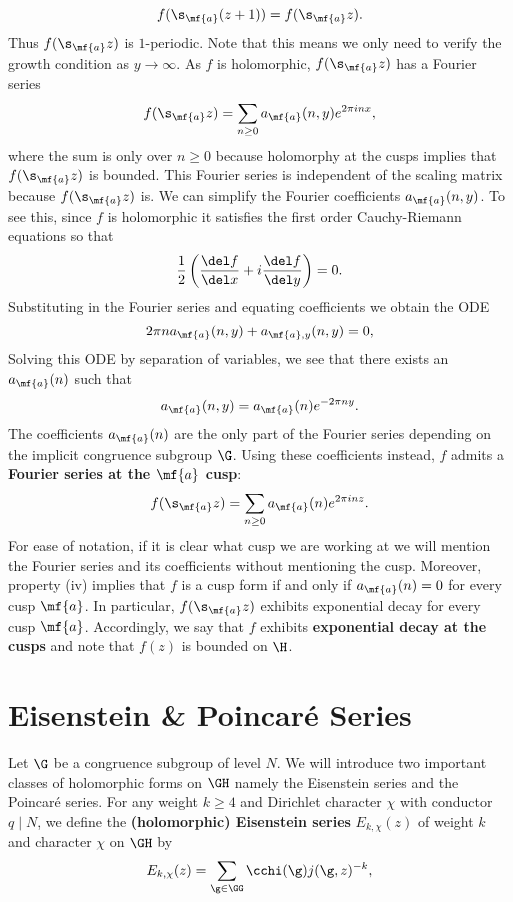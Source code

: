     \[
      f(\s_{\mf{a}}(z+1)) = f(\s_{\mf{a}}z).
    \]
    Thus $f(\s_{\mf{a}}z)$ is $1$-periodic. Note that this means we only need to verify the growth condition as $y \to \infty$. As $f$ is holomorphic, $f(\s_{\mf{a}}z)$ has a Fourier series
    \[
      f(\s_{\mf{a}}z) = \sum_{n \ge 0}a_{\mf{a}}(n,y)e^{2\pi inx},
    \]
    where the sum is only over $n \ge 0$ because holomorphy at the cusps implies that $f(\s_{\mf{a}}z)$ is bounded. This Fourier series is independent of the scaling matrix because $f(\s_{\mf{a}}z)$ is. We can simplify the Fourier coefficients $a_{\mf{a}}(n,y)$. To see this, since $f$ is holomorphic it satisfies the first order Cauchy-Riemann equations so that
    \[
      \frac{1}{2}\left(\frac{\del f}{\del x}+i\frac{\del f}{\del y}\right) = 0.
    \]
    Substituting in the Fourier series and equating coefficients we obtain the ODE
    \[
      2\pi na_{\mf{a}}(n,y)+a_{\mf{a},y}(n,y) = 0,
    \]
    Solving this ODE by separation of variables, we see that there exists an $a_{\mf{a}}(n)$ such that
    \[
      a_{\mf{a}}(n,y) = a_{\mf{a}}(n)e^{-2\pi ny}.
    \]
    The coefficients $a_{\mf{a}}(n)$ are the only part of the Fourier series depending on the implicit congruence subgroup $\G$. Using these coefficients instead, $f$ admits a \textbf{Fourier series at the $\mf{a}$ cusp}:
    \[
      f(\s_{\mf{a}}z) = \sum_{n \ge 0}a_{\mf{a}}(n)e^{2\pi inz}.
    \]
    For ease of notation, if it is clear what cusp we are working at we will mention the Fourier series and its coefficients without mentioning the cusp. Moreover, property (iv) implies that $f$ is a cusp form if and only if $a_{\mf{a}}(n) = 0$ for every cusp $\mf{a}$. In particular, $f(\s_{\mf{a}}z)$ exhibits exponential decay for every cusp $\mf{a}$. Accordingly, we say that $f$ exhibits \textbf{exponential decay at the cusps} and note that $f(z)$ is bounded on $\H$.
  \section{Eisenstein \& Poincar\'e Series}
    Let $\G$ be a congruence subgroup of level $N$. We will introduce two important classes of holomorphic forms on $\GH$ namely the Eisenstein series and the Poincar\'e series. For any weight $k \ge 4$ and Dirichlet character $\chi$ with conductor $q \mid N$, we define the \textbf{(holomorphic) Eisenstein series} $E_{k,\chi}(z)$ of weight $k$ and character $\chi$ on $\GH$ by
    \[
      E_{k,\chi}(z) = \sum_{\g \in \GG}\cchi(\g)j(\g,z)^{-k},
    \]

